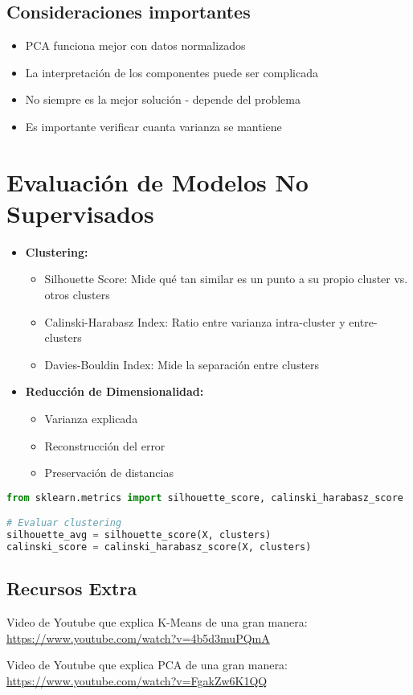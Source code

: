 \documentclass[12pt]{article}
\begin{document}
\subsection{Consideraciones importantes}
\begin{itemize}
    \item PCA funciona mejor con datos normalizados
    \item La interpretación de los componentes puede ser complicada
    \item No siempre es la mejor solución - depende del problema
    \item Es importante verificar cuanta varianza se mantiene
\end{itemize}

\section{Evaluación de Modelos No Supervisados}
\begin{itemize}
    \item \textbf{Clustering:}
    \begin{itemize}
        \item Silhouette Score: Mide qué tan similar es un punto a su propio cluster vs. otros clusters
        \item Calinski-Harabasz Index: Ratio entre varianza intra-cluster y entre-clusters
        \item Davies-Bouldin Index: Mide la separación entre clusters
    \end{itemize}
    \item \textbf{Reducción de Dimensionalidad:}
    \begin{itemize}
        \item Varianza explicada
        \item Reconstrucción del error
        \item Preservación de distancias
    \end{itemize}
\end{itemize}

\begin{lstlisting}[language=Python]
from sklearn.metrics import silhouette_score, calinski_harabasz_score

# Evaluar clustering
silhouette_avg = silhouette_score(X, clusters)
calinski_score = calinski_harabasz_score(X, clusters)
\end{lstlisting}

\subsection{Recursos Extra}

Video de Youtube que explica K-Means de una gran manera: \\
\url{https://www.youtube.com/watch?v=4b5d3muPQmA}

\vspace{1em}

Video de Youtube que explica PCA de una gran manera: \\
\url{https://www.youtube.com/watch?v=FgakZw6K1QQ}
\end{document}
